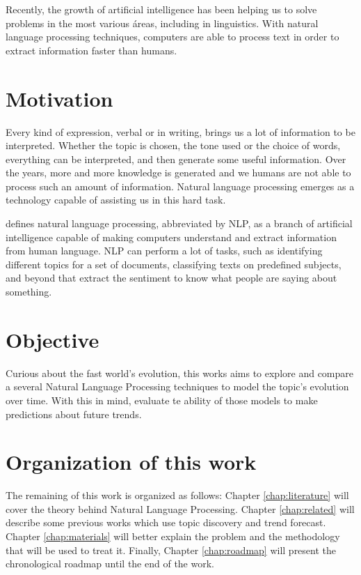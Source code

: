 Recently, the growth of artificial intelligence has been helping us to solve problems in the most various áreas, including in linguistics. With natural language processing techniques, computers are able to process text in order to extract information faster than humans.


\section{Motivation}

Every kind of expression, verbal or in writing, brings us a lot of information to be interpreted. Whether the topic is chosen, the tone used or the choice of words, everything can be interpreted, and then generate some useful information. Over the years, more and more knowledge is generated and we humans are not able to process such an amount of information. Natural language processing emerges as a technology capable of assisting us in this hard task.

 defines natural language processing, abbreviated by NLP, as a branch of artificial intelligence capable of making computers understand and extract information from human language. NLP can perform a lot of tasks, such as identifying different topics for a set of documents, classifying texts on predefined subjects, and beyond that extract the sentiment to know what people are saying about something.

% 

\section{Objective}

Curious about the fast world's evolution, this works aims to explore and compare a several Natural Language Processing techniques to model the topic's evolution over time. With this in mind, evaluate te ability of those models to make predictions about future trends.


\section{Organization of this work}

The remaining of this work is organized as follows: Chapter \ref{chap:literature} will cover the theory behind Natural Language Processing. Chapter \ref{chap:related} will describe some previous works which use topic discovery and trend forecast. Chapter \ref{chap:materials} will better explain the problem and the methodology that will be used to treat it. Finally, Chapter \ref{chap:roadmap} will present the chronological roadmap until the end of the work.
